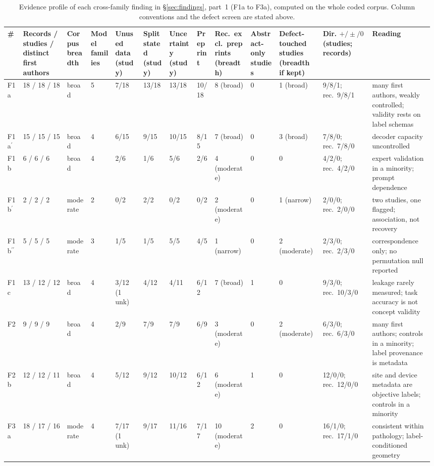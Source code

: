 \begin{table}
\centering\scriptsize\setlength\tabcolsep{2pt}\renewcommand{\arraystretch}{1.0}
\caption{Evidence profile of each cross-family finding in \S\ref{sec:findings}, part~1 (F1a to F3a), computed on the whole coded corpus. Column conventions and the defect screen are stated above.}
\label{tab:profile}
\begin{tabular}{@{}L{0.75cm}C{1.35cm}C{1.5cm}C{0.9cm}C{1.05cm}C{1.15cm}C{1.05cm}C{1.55cm}C{1.05cm}C{1.6cm}C{1.45cm}C{1.1cm}L{3.3cm}@{}}
\toprule
\# & Records / studies / distinct first authors & Corpus breadth & Model families & Unused data (study) & Split stated (study) & Uncertainty (study) &  Preprint & Rec.\ excl.\ preprints (breadth) & Abstract-only studies & Defect-touched studies (breadth if kept) & Dir. $+/\pm/0$ (studies; records) & Reading \\
\midrule
F1a & 18 / 18 / 18 & broad & 5 & 7/18 & 13/18 & 13/18 & 10/18 & 8 (broad) & 0 & 1 (broad) & 9/8/1; rec.\ 9/8/1 & many first authors, weakly controlled; validity rests on label schemas \\
F1a$^{\prime}$ & 15 / 15 / 15 & broad & 4 & 6/15 & 9/15 & 10/15 & 8/15 & 7 (broad) & 0 & 3 (broad) & 7/8/0; rec.\ 7/8/0 & decoder capacity uncontrolled \\
F1b & 6 / 6 / 6 & broad & 4 & 2/6 & 1/6 & 5/6 & 2/6 & 4 (moderate) & 0 & 0 & 4/2/0; rec.\ 4/2/0 & expert validation in a minority; prompt dependence \\
F1b$^{\prime}$ & 2 / 2 / 2 & moderate & 2 & 0/2 & 2/2 & 0/2 & 0/2 & 2 (moderate) & 0 & 1 (narrow) & 2/0/0; rec.\ 2/0/0 & two studies, one flagged; association, not recovery \\
F1b$^{\prime\prime}$ & 5 / 5 / 5 & moderate & 3 & 1/5 & 1/5 & 5/5 & 4/5 & 1 (narrow) & 0 & 2 (moderate) & 2/3/0; rec.\ 2/3/0 & correspondence only; no permutation null reported \\
F1c & 13 / 12 / 12 & broad & 4 & 3/12 (1 unk) & 4/12 & 4/11 & 6/12 & 7 (broad) & 1 & 0 & 9/3/0; rec.\ 10/3/0 & leakage rarely measured; task accuracy is not concept validity \\
F2 & 9 / 9 / 9 & broad & 4 & 2/9 & 7/9 & 7/9 & 6/9 & 3 (moderate) & 0 & 2 (moderate) & 6/3/0; rec.\ 6/3/0 & many first authors; controls in a minority; label provenance is metadata \\
F2b & 12 / 12 / 11 & broad & 4 & 5/12 & 9/12 & 10/12 & 6/12 & 6 (moderate) & 1 & 0 & 12/0/0; rec.\ 12/0/0 & site and device metadata are objective labels; controls in a minority \\
F3a & 18 / 17 / 16 & moderate & 4 & 7/17 (1 unk) & 9/17 & 11/16 & 7/17 & 10 (moderate) & 2 & 0 & 16/1/0; rec.\ 17/1/0 & consistent within pathology; label-conditioned geometry \\
\bottomrule
\end{tabular}
\end{table}
